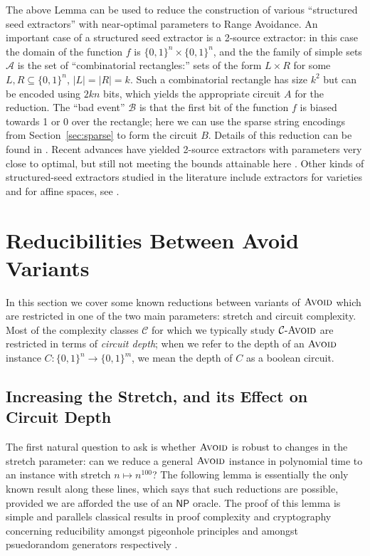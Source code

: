\documentclass[11pt]{article}
\newcommand{\todo}[1]{\textcolor{red}{TODO: #1}}
\newcommand{\dash}{\text{-}}
\newcommand{\B}{\{0,1\}}
\newcommand{\avoid}{\textsc{Avoid}}
\begin{document}
The above Lemma can be used to reduce the construction of various ``structured seed extractors'' with near-optimal parameters to Range Avoidance. An important case of a structured seed extractor is a 2-source extractor: in this case the domain of the function $f$ is $\B^n \times \B^n$, and the the family of simple sets $\mathcal{A}$ is the set of ``combinatorial rectangles:'' sets of the form $L \times R$ for some $L, R \subseteq \B^n$, $|L|=|R|=k$. Such a combinatorial rectangle has size $k^2$ but can be encoded using $ 2kn$ bits, which yields the appropriate circuit $A$ for the reduction. The ``bad event'' $\mathcal{B}$ is that the first bit of the function $f$ is biased towards 1 or 0 over the rectangle; here we can use the sparse string encodings from Section~\ref{sec:sparse} to form the circuit $B$. Details of this reduction can be found in \cite{Korten1}. Recent advances have yielded 2-source extractors with parameters very close to optimal, but still not meeting the bounds attainable here \cite{li-extractor,extractors-survey}. Other kinds of structured-seed extractors studied in the literature include extractors for varieties and for affine spaces, see \cite{varieties,affine}.

\section{Reducibilities Between Avoid Variants}\label{sec:reducibility-variants}
In this section we cover some known reductions between variants of $\avoid$ which are restricted in one of the two main parameters: stretch and circuit complexity. Most of the complexity classes $\mathcal{C}$ for which we typically study $\mathcal{C}\dash\avoid$ are restricted in terms of \emph{circuit depth}; when we refer to the depth of an $\avoid$ instance $C: \B^n \to \B^m$, we mean the depth of $C$ as a boolean circuit.
\subsection{Increasing the Stretch, and its Effect on Circuit Depth}
The first natural question to ask is whether $\avoid$ is robust to changes in the stretch parameter: can we reduce a general $\avoid$ instance in polynomial time to an instance with stretch $n \mapsto n^{100}$? The following lemma is essentially the only known result along these lines, which says that such reductions are possible, provided we are afforded the use of an $\mathsf{NP}$ oracle. The proof of this lemma is simple and parallels classical results in proof complexity and cryptography concerning reducibility amongst pigeonhole principles and amongst psuedorandom generators respectively \cite{Paris-Wilkie-Woods,GGM}.
\end{document}
